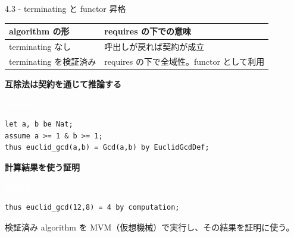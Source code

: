 \documentclass[dvipdfmx,aspectratio=169,11pt]{beamer}
\newcommand{\statusbadge}[2]{\colorbox{#1}{\textcolor{white}{\strut\scriptsize\sffamily\bfseries #2}}}
\newcommand{\badgeSketch}{\statusbadge{orange!75!black}{sketch}}
\begin{document}
\begin{frame}[fragile,t]{4.3 - terminating と functor 昇格}
\par{}
\begin{footnotesize}
\setlength{\tabcolsep}{3pt}
\renewcommand{\arraystretch}{1.15}
\begin{tabularx}{\textwidth}{l>{\raggedright\arraybackslash}X}
\toprule
\textbf{algorithm の形} & \textbf{requires の下での意味} \\
\midrule
terminating なし & 呼出しが戻れば契約が成立 \\
terminating を検証済み & requires の下で全域性。functor として利用 \\
\bottomrule
\end{tabularx}
\end{footnotesize}

\smallskip
\textbf{互除法は契約を通じて推論する}~\badgeSketch
\begin{lstlisting}[language={mizar},basicstyle=\ttfamily\small]
let a, b be Nat;
assume a >= 1 & b >= 1;
thus euclid_gcd(a,b) = Gcd(a,b) by EuclidGcdDef;
\end{lstlisting}
\smallskip
\textbf{計算結果を使う証明}~\badgeSketch
\begin{lstlisting}[language={mizar},basicstyle=\ttfamily\small]
thus euclid_gcd(12,8) = 4 by computation;
\end{lstlisting}
検証済み algorithm を MVM（仮想機械）で実行し、その結果を証明に使う。

\end{frame}
\end{document}
